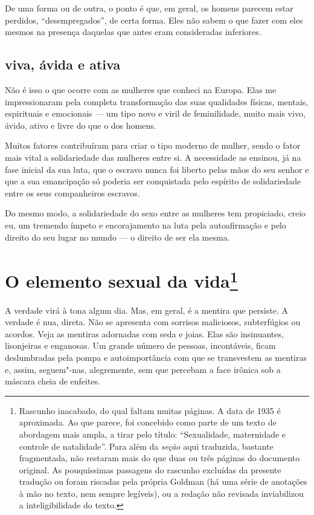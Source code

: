 De uma forma ou de outra, o ponto é que, em geral, os homens parecem
estar perdidos, ``desempregados'', de certa forma. Eles não sabem o que
fazer com eles mesmos na presença daquelas que antes eram consideradas
inferiores.

\section{viva, ávida e ativa}

Não é isso o que ocorre com as mulheres que conheci na Europa. Elas me
impressionaram pela completa transformação das suas qualidades físicas,
mentais, espirituais e emocionais --- um tipo novo e viril de
feminilidade, muito mais vivo, ávido, ativo e livre do que o dos homens.

Muitos fatores contribuíram para criar o tipo moderno de mulher, sendo o
fator mais vital a solidariedade das mulheres entre si. A necessidade as
ensinou, já na fase inicial da sua luta, que o escravo nunca foi liberto
pelas mãos do seu senhor e que a sua emancipação só poderia ser
conquistada pelo espírito de solidariedade entre os seus companheiros
escravos.

Do mesmo modo, a solidariedade do sexo entre as mulheres tem propiciado,
creio eu, um tremendo ímpeto e encorajamento na luta pela autoafirmação
e pelo direito do seu lugar no mundo --- o direito de ser ela mesma.

\chapter{O elemento sexual da vida\footnote{Rascunho inacabado, do qual faltam muitas
  páginas. A data de 1935 é aproximada. Ao que parece, foi
  concebido como parte de um texto de abordagem mais ampla, a tirar pelo
  título: ``Sexualidade, maternidade e controle de natalidade''. Para
  além da \textit{seção} aqui traduzida, bastante fragmentada, não restaram
  mais do que duas ou três páginas do documento original. As
  pouquíssimas passagens do rascunho excluídas da presente tradução ou
  foram riscadas pela própria Goldman (há uma série de anotações à mão
  no texto, nem sempre legíveis), ou a redação não revisada inviabilizou
  a inteligibilidade do texto.}}\label{sexual}

A verdade virá à tona algum dia. Mas, em geral, é a mentira que
persiste. A verdade é nua, direta. Não se apresenta com sorrisos
maliciosos, subterfúgios ou acordos. Veja as mentiras adornadas com seda
e joias. Elas são insinuantes, lisonjeiras e enganosas. Um grande número de pessoas,
incontáveis, ficam deslumbradas pela pompa e autoimportância com que se
transvestem as mentiras e, assim, seguem"-nas, alegremente, sem que percebam
a face irônica sob a máscara cheia de enfeites.

